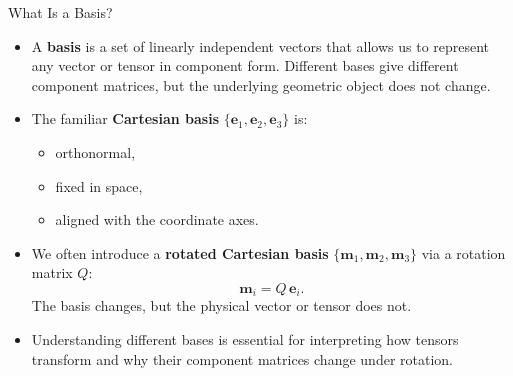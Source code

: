 \documentclass{beamer}
\begin{document}
\begin{frame}{What Is a Basis?}

\begin{itemize}

    \item A \textbf{basis} is a set of linearly independent vectors that allows us
          to represent any vector or tensor in component form.
          Different bases give different component matrices, but the
          underlying geometric object does not change.

    \item The familiar \textbf{Cartesian basis}
          $\{\mathbf{e}_1,\mathbf{e}_2,\mathbf{e}_3\}$ is:
          \begin{itemize}
              \item orthonormal,
              \item fixed in space,
              \item aligned with the coordinate axes.
          \end{itemize}

    \item We often introduce a \textbf{rotated Cartesian basis}
          $\{\mathbf{m}_1,\mathbf{m}_2,\mathbf{m}_3\}$ via a rotation matrix $Q$:
          \[
              \mathbf{m}_i = Q\,\mathbf{e}_i.
          \]
          The basis changes, but the physical vector or tensor does not.

    \item Understanding different bases is essential for interpreting how tensors
          transform and why their component matrices change under rotation.

\end{itemize}

\end{frame}
\end{document}

